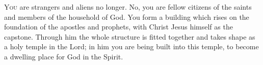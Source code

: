 
\lettrine{Y}{ou} are strangers and aliens no longer. No, you are fellow citizens of the saints and members of the household of God. You form a building which rises on the foundation of the apostles and prophets, with Christ Jesus himself as the capstone. Through him the whole structure is fitted together and takes shape as a holy temple in the Lord; in him you are being built into this temple, to become a dwelling place for God in the Spirit.